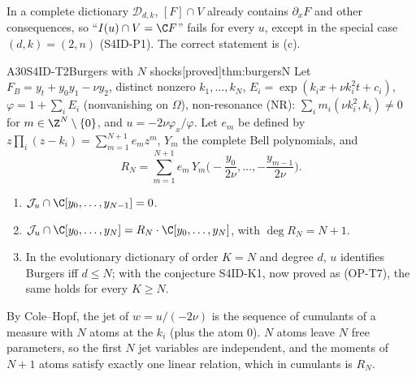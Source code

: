 \documentclass[11pt,a4paper,oneside]{report}
\newcommand{\badge}[2]{\textcolor{#1}{\textsf{\footnotesize[#2]}}}
\newcommand{\proved}{\badge{cC}{proved}}
\newcommand{\led}[1]{\textcolor{cG}{\textsf{\footnotesize(#1)}}}
\newenvironment{dimcard}[5]{\par\Needspace{12\baselineskip}\begin{dimcardbox}{#1}{#2}{#3}{#4}{#5}}{\end{dimcardbox}}
\begin{document}
\begin{caution}[title={The literal statement is false}]
In a complete dictionary $\mathcal D_{d,k}$, $[F]\cap V$ already contains $\partial_xF$ and other consequences, so ``$I(u)\cap V=\C F$'' fails for every $u$, except in the special case $(d,k)=(2,n)$ \led{S4ID-P1}. The correct statement is (c).
\end{caution}

\begin{dimcard}{A30}{S4ID-T2}{Burgers with $N$ shocks}{\proved}{thm:burgersN}
Let $F_B=y_t+y_0y_1-\nu y_2$, distinct nonzero $k_1,\dots,k_N$, $E_i=\exp(k_ix+\nu k_i^2t+c_i)$, $\varphi=1+\sum_iE_i$ (nonvanishing on $\Omega$), non-resonance (NR): $\sum_im_i(\nu k_i^2,k_i)\ne0$ for $m\in\Z^N\setminus\{0\}$, and $u=-2\nu\varphi_x/\varphi$. Let $e_m$ be defined by $z\prod_i(z-k_i)=\sum_{m=1}^{N+1}e_mz^m$, $Y_m$ the complete Bell polynomials, and
\[
R_N=\sum_{m=1}^{N+1}e_m\,Y_m\Big(-\frac{y_0}{2\nu},\dots,-\frac{y_{m-1}}{2\nu}\Big).
\]
\begin{enumerate}[label=(\alph*)]
\item $\mathcal J_u\cap\C[y_0,\dots,y_{N-1}]=0$.
\item $\mathcal J_u\cap\C[y_0,\dots,y_N]=R_N\cdot\C[y_0,\dots,y_N]$, with $\deg R_N=N+1$.
\item In the evolutionary dictionary of order $K=N$ and degree $d$, $u$ identifies Burgers iff $d\le N$; with the conjecture S4ID-K1, now proved as \led{OP-T7}, the same holds for every $K\ge N$.
\end{enumerate}
\end{dimcard}

\begin{proofidea}
By Cole--Hopf, the jet of $w=u/(-2\nu)$ is the sequence of cumulants of a measure with $N$ atoms at the $k_i$ (plus the atom $0$). $N$ atoms leave $N$ free parameters, so the first $N$ jet variables are independent, and the moments of $N+1$ atoms satisfy exactly one linear relation, which in cumulants is $R_N$.
\end{proofidea}
\end{document}
